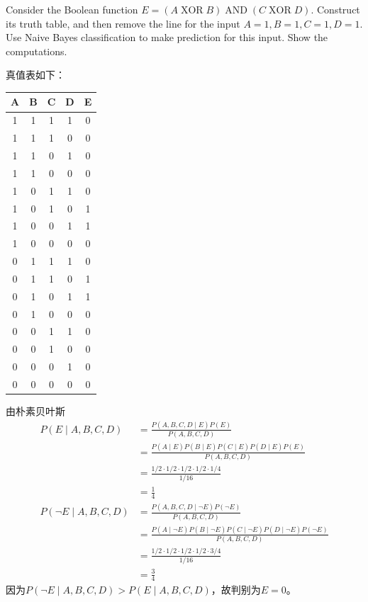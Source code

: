 \documentclass[a4paper, 11pt]{article}
\begin{document}
\begin{question}\normalfont
Consider the Boolean function $E = (A\;\mathrm{XOR}\;B) \;\mathrm{AND}\; (C\;\mathrm{XOR}\;D)$. Construct its truth table, and then remove the line for the input $A = 1, B = 1, C = 1, D = 1$. Use Naive Bayes classification to make prediction for this input. Show the computations.
\end{question}
\begin{answer}
真值表如下：
\begin{center}
\begin{longtable}{|c|c|c|c|c|}\hline
A & B & C & D & E\\\hline
1 & 1 & 1 & 1 & 0\\\hline
1 & 1 & 1 & 0 & 0\\\hline
1 & 1 & 0 & 1 & 0\\\hline
1 & 1 & 0 & 0 & 0\\\hline
1 & 0 & 1 & 1 & 0\\\hline
1 & 0 & 1 & 0 & 1\\\hline
1 & 0 & 0 & 1 & 1\\\hline
1 & 0 & 0 & 0 & 0\\\hline
0 & 1 & 1 & 1 & 0\\\hline
0 & 1 & 1 & 0 & 1\\\hline
0 & 1 & 0 & 1 & 1\\\hline
0 & 1 & 0 & 0 & 0\\\hline
0 & 0 & 1 & 1 & 0\\\hline
0 & 0 & 1 & 0 & 0\\\hline
0 & 0 & 0 & 1 & 0\\\hline
0 & 0 & 0 & 0 & 0\\\hline
\end{longtable}
\end{center}
由朴素贝叶斯
\[\begin{aligned}
P(E\mid A,B,C,D)
&=\frac{P(A,B,C,D\mid E)P(E)}{P(A,B,C,D)}\\
&=\frac{P(A\mid E) P(B\mid E) P(C\mid E) P(D\mid E) P(E)}{P(A,B,C,D)}\\
&=\frac{1/2\cdot 1/2\cdot 1/2\cdot 1/2\cdot 1/4}{1/16}\\
&=\frac{1}{4}\\
P(\lnot E\mid A,B,C,D)
&=\frac{P(A,B,C,D\mid \lnot E)P(\lnot E)}{P(A,B,C,D)}\\
&=\frac{P(A\mid \lnot E) P(B\mid \lnot E) P(C\mid \lnot E) P(D\mid \lnot E) P(\lnot E)}{P(A,B,C,D)}\\
&=\frac{1/2\cdot 1/2\cdot 1/2\cdot 1/2\cdot 3/4}{1/16}\\
&=\frac{3}{4}
\end{aligned}\]
因为$P(\lnot E\mid A,B,C,D)>P(E\mid A,B,C,D)$，故判别为$E=0$。
\end{answer}
\end{document}
